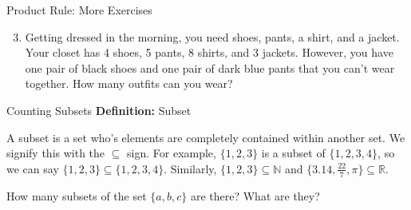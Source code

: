 \documentclass{beamer}
\begin{document}
\begin{frame}{Product Rule: More Exercises}
    \begin{enumerate}
    \setcounter{enumi}{2}
    \item Getting dressed in the morning, you need shoes, pants, a shirt, and a jacket. Your closet has 4 shoes, 5 pants, 8 shirts, and 3 jackets. However, you have one pair of black shoes and one pair of dark blue pants that you can't wear together. How many outfits can you wear?\newline
    
    \end{enumerate}
\end{frame}

\begin{frame}{Counting Subsets}
    \textbf{Definition:} Subset
    
    A subset is a set who's elements are completely contained within another set. We signify this with the $\subseteq$ sign. For example, $\{1,2,3\}$ is a subset of $\{1,2,3,4\}$, so we can say $\{1,2,3\} \subseteq \{1,2,3,4\}$. Similarly, $\{1,2,3\} \subseteq \mathbb{N}$ and $\{3.14, \tfrac{22}{7}, \pi\} \subseteq \mathbb{R}$.\newline
    
    How many subsets of the set $\{a,b,c\}$ are there? What are they?
    
\end{frame}
\end{document}
